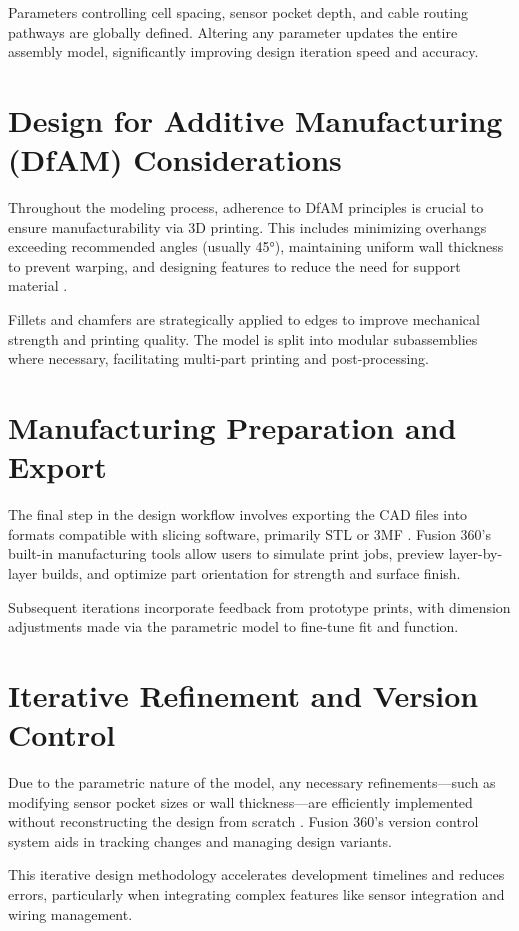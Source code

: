 Parameters controlling cell spacing, sensor pocket depth, and cable routing pathways are globally defined. Altering any parameter updates the entire assembly model, significantly improving design iteration speed and accuracy.

\section{Design for Additive Manufacturing (DfAM) Considerations}

Throughout the modeling process, adherence to DfAM principles is crucial to ensure manufacturability via 3D printing. This includes minimizing overhangs exceeding recommended angles (usually 45°), maintaining uniform wall thickness to prevent warping, and designing features to reduce the need for support material \cite{anderson2020}.

Fillets and chamfers are strategically applied to edges to improve mechanical strength and printing quality. The model is split into modular subassemblies where necessary, facilitating multi-part printing and post-processing.

\section{Manufacturing Preparation and Export}

The final step in the design workflow involves exporting the CAD files into formats compatible with slicing software, primarily STL or 3MF \cite{gebhardt2016}. Fusion 360’s built-in manufacturing tools allow users to simulate print jobs, preview layer-by-layer builds, and optimize part orientation for strength and surface finish.

Subsequent iterations incorporate feedback from prototype prints, with dimension adjustments made via the parametric model to fine-tune fit and function.

\section{Iterative Refinement and Version Control}

Due to the parametric nature of the model, any necessary refinements—such as modifying sensor pocket sizes or wall thickness—are efficiently implemented without reconstructing the design from scratch \cite{hogan2025}. Fusion 360’s version control system aids in tracking changes and managing design variants.

This iterative design methodology accelerates development timelines and reduces errors, particularly when integrating complex features like sensor integration and wiring management.



